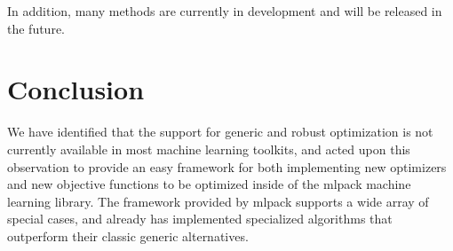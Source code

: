 \documentclass{article}
\begin{document}
In addition, many methods are currently in development and will be released in
the future.

\vspace*{-0.4em}
\section{Conclusion}
\vspace*{-0.3em}

We have identified that the support for generic and robust optimization is not
currently available in most machine learning toolkits, and acted upon this
observation to provide an easy framework for both implementing new optimizers
and new objective functions to be optimized inside of the mlpack machine
learning library.
The framework provided by mlpack supports a wide array of special cases, and
already has implemented specialized algorithms that outperform their classic
generic alternatives.



\end{document}
